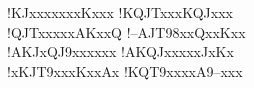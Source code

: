 \documentclass[a4paper,italian]{article}
\newcommand{\void}{--}
\begin{document}
\begin{multicols*}{2}
\begin{center}
                                            \gamefont{\rmfamily\normalsize}
                                            \otherfont{\rmfamily\normalsize}
                                            \bidderfont{\rmfamily\normalsize}
                                            \hand!{KJxxxxx}{x}{x}{Kxxx}\qquad\qquad
                                            \hand!{KQJTxxx}{KQJ}{xx}{x}\qquad\qquad\\
                                            \smallskip
                                            \hand!{QJTxxxx}{x}{AKxx}{Q}\qquad\qquad
                                            \hand!{\void}{AJT98xx}{Qxx}{Kxx}\qquad\qquad\\
                                            \smallskip
                                            \hand!{AKJx}{QJ9xxxx}{x}{x}\qquad\qquad
                                            \hand!{AKQJxxx}{xx}{Jx}{Kx}\qquad\qquad\\
                                            \smallskip
                                            \hand!{x}{KJT9xxx}{Kxx}{Ax}\qquad\qquad
                                            \hand!{KQT9xxxx}{A9}{\void}{xxx}\qquad
                                        \end{center}


                                    \end{multicols*}
                                    \newpage
\end{document}
